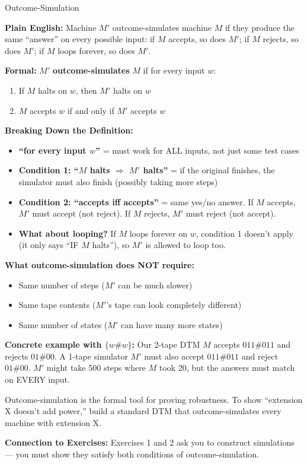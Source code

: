 \documentclass[11pt,a4paper]{article}
\newcommand{\kt}[1]{\par\vspace{0.3em}\colorbox{yellow!60}{\parbox{\dimexpr\linewidth-2\fboxsep}{#1}}\vspace{0.3em}}
\begin{document}
\begin{definitionbox}{Outcome-Simulation}

\textbf{Plain English:} Machine $M'$ outcome-simulates machine $M$ if they produce the same ``answer'' on every possible input: if $M$ accepts, so does $M'$; if $M$ rejects, so does $M'$; if $M$ loops forever, so does $M'$.

\textbf{Formal:} $M'$ \textbf{outcome-simulates} $M$ if for every input $w$:
\begin{enumerate}[nosep]
\item If $M$ halts on $w$, then $M'$ halts on $w$
\item $M$ accepts $w$ if and only if $M'$ accepts $w$
\end{enumerate}

\textbf{Breaking Down the Definition:}
\begin{itemize}[nosep]
\item \textbf{``for every input $w$''} = must work for ALL inputs, not just some test cases
\item \textbf{Condition 1: ``$M$ halts $\Rightarrow$ $M'$ halts''} = if the original finishes, the simulator must also finish (possibly taking more steps)
\item \textbf{Condition 2: ``accepts iff accepts''} = same yes/no answer. If $M$ accepts, $M'$ must accept (not reject). If $M$ rejects, $M'$ must reject (not accept).
\item \textbf{What about looping?} If $M$ loops forever on $w$, condition 1 doesn't apply (it only says ``IF $M$ halts''), so $M'$ is allowed to loop too.
\end{itemize}

\textbf{What outcome-simulation does NOT require:}
\begin{itemize}[nosep]
\item Same number of steps ($M'$ can be much slower)
\item Same tape contents ($M'$'s tape can look completely different)
\item Same number of states ($M'$ can have many more states)
\end{itemize}

\textbf{Concrete example with $\{w\#w\}$:} Our 2-tape DTM $M$ accepts $011\#011$ and rejects $01\#00$. A 1-tape simulator $M'$ must also accept $011\#011$ and reject $01\#00$. $M'$ might take 500 steps where $M$ took 20, but the answers must match on EVERY input.

\kt{Outcome-simulation is the formal tool for proving robustness. To show ``extension X doesn't add power,'' build a standard DTM that outcome-simulates every machine with extension X.}

\textbf{Connection to Exercises:} Exercises 1 and 2 ask you to construct simulations --- you must show they satisfy both conditions of outcome-simulation.
\end{definitionbox}
\end{document}
